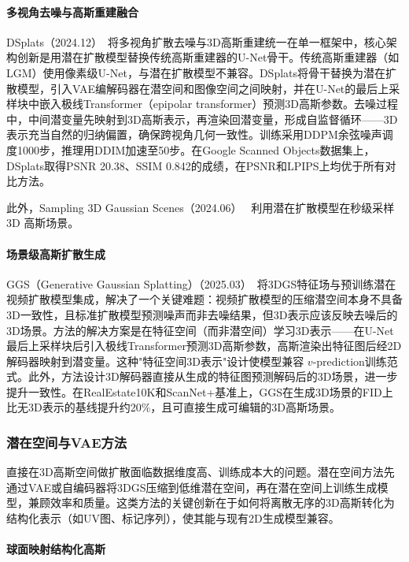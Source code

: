 \paragraph{多视角去噪与高斯重建融合}

DSplats（2024.12）~\cite{2412_09648}将多视角扩散去噪与3D高斯重建统一在单一框架中，核心架构创新是用潜在扩散模型替换传统高斯重建器的U-Net骨干。传统高斯重建器（如LGM）使用像素级U-Net，与潜在扩散模型不兼容。DSplats将骨干替换为潜在扩散模型，引入VAE编解码器在潜空间和图像空间之间映射，并在U-Net的最后上采样块中嵌入极线Transformer（epipolar transformer）预测3D高斯参数。去噪过程中，中间潜变量先映射到3D高斯表示，再渲染回潜变量，形成自监督循环——3D表示充当自然的归纳偏置，确保跨视角几何一致性。训练采用DDPM余弦噪声调度1000步，推理用DDIM加速至50步。在Google Scanned Objects数据集上，DSplats取得PSNR 20.38、SSIM 0.842的成绩，在PSNR和LPIPS上均优于所有对比方法。

此外，Sampling 3D Gaussian Scenes（2024.06）~\cite{2406_13099} 利用潜在扩散模型在秒级采样 3D 高斯场景。

\paragraph{场景级高斯扩散生成}

GGS（Generative Gaussian Splatting）（2025.03）~\cite{2503_13272}将3DGS特征场与预训练潜在视频扩散模型集成，解决了一个关键难题：视频扩散模型的压缩潜空间本身不具备3D一致性，且标准扩散模型预测噪声而非去噪结果，但3D表示应该反映去噪后的3D场景。方法的解决方案是在特征空间（而非潜空间）学习3D表示——在U-Net最后上采样块后引入极线Transformer预测3D高斯参数，高斯渲染出特征图后经2D解码器映射到潜变量。这种"特征空间3D表示"设计使模型兼容 $v$-prediction训练范式。此外，方法设计3D解码器直接从生成的特征图预测解码后的3D场景，进一步提升一致性。在RealEstate10K和ScanNet+基准上，GGS在生成3D场景的FID上比无3D表示的基线提升约20\%，且可直接生成可编辑的3D高斯场景。

\subsubsection{潜在空间与VAE方法}

直接在3D高斯空间做扩散面临数据维度高、训练成本大的问题。潜在空间方法先通过VAE或自编码器将3DGS压缩到低维潜在空间，再在潜在空间上训练生成模型，兼顾效率和质量。这类方法的关键创新在于如何将离散无序的3D高斯转化为结构化表示（如UV图、标记序列），使其能与现有2D生成模型兼容。

\paragraph{球面映射结构化高斯}

